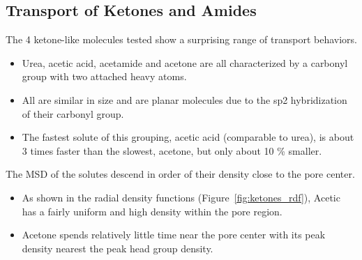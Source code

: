 \documentclass{article}
\begin{document}
  
  

  \subsection*{Transport of Ketones and Amides}
  
  The 4 ketone-like molecules tested show a surprising range of transport behaviors.
  \begin{itemize}
    \item Urea, acetic acid, acetamide and acetone are all characterized by a carbonyl group
    with two attached heavy atoms. 
    \item All are similar in size and are planar molecules due to the sp2 hybridization of
    their carbonyl group.
    \item The fastest solute of this grouping, acetic acid (comparable to urea), is about
    3 times faster than the slowest, acetone, but only about 10 \% smaller.
  \end{itemize}
  
  The MSD of the solutes descend in order of their density close to the pore center.
  \begin{itemize}
    \item As shown in the radial density functions (Figure~\ref{fig:ketones_rdf}), 
    Acetic has a fairly uniform and high density within the pore region.
    \item Acetone spends relatively little time near the pore center with its
    peak density nearest the peak head group density.
  \end{itemize}
  
\end{document}
